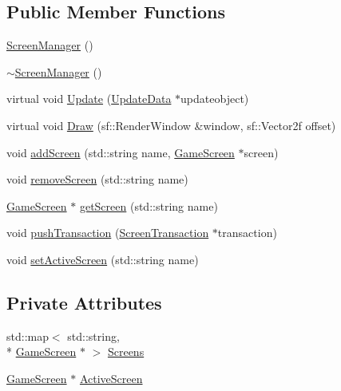 \subsection*{Public Member Functions}
\begin{DoxyCompactItemize}
\item 
\hyperlink{class_screen_manager_ab397f82b180ee7d50cc1e305c19ed733}{Screen\-Manager} ()
\item 
\hyperlink{class_screen_manager_a515ec6aabc9fefe3c1cfbe734877da1e}{$\sim$\-Screen\-Manager} ()
\item 
virtual void \hyperlink{class_screen_manager_a269d1b374ba195a036f03bd3caa897d9}{Update} (\hyperlink{class_update_data}{Update\-Data} $\ast$updateobject)
\item 
virtual void \hyperlink{class_screen_manager_abcf990ad052121e6ebd2ab03771657df}{Draw} (sf\-::\-Render\-Window \&window, sf\-::\-Vector2f offset)
\item 
void \hyperlink{class_screen_manager_a2e6e206c2ff265c534c802898c9c078b}{add\-Screen} (std\-::string name, \hyperlink{class_game_screen}{Game\-Screen} $\ast$screen)
\item 
void \hyperlink{class_screen_manager_a9bb115d54e94b72618361f4a347e26c8}{remove\-Screen} (std\-::string name)
\item 
\hyperlink{class_game_screen}{Game\-Screen} $\ast$ \hyperlink{class_screen_manager_a510ee04534746a6e72fa789539dc2d83}{get\-Screen} (std\-::string name)
\item 
void \hyperlink{class_screen_manager_aa806de1587575859315d975daa025688}{push\-Transaction} (\hyperlink{class_screen_transaction}{Screen\-Transaction} $\ast$transaction)
\item 
void \hyperlink{class_screen_manager_a578dea02971b86905fee58593622495b}{set\-Active\-Screen} (std\-::string name)
\end{DoxyCompactItemize}
\subsection*{Private Attributes}
\begin{DoxyCompactItemize}
\item 
std\-::map$<$ std\-::string, \\*
\hyperlink{class_game_screen}{Game\-Screen} $\ast$ $>$ \hyperlink{class_screen_manager_a54eb2c9667efda525a35d0d7043e8807}{Screens}
\item 
\hyperlink{class_game_screen}{Game\-Screen} $\ast$ \hyperlink{class_screen_manager_abb46941be1b908a2b9d8053409e89597}{Active\-Screen}
\end{DoxyCompactItemize}


